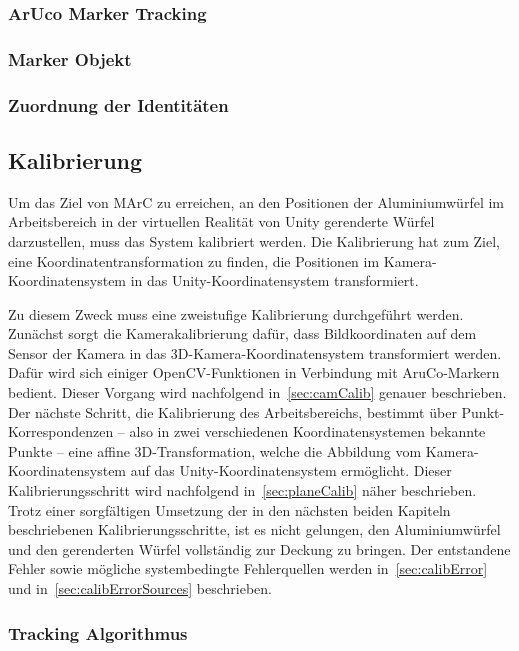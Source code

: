 \subsubsection{ArUco Marker Tracking}
\subsubsection{Marker Objekt}
\subsubsection{Zuordnung der Identitäten}



\subsection{Kalibrierung}\label{sec:calib}
Um das Ziel von MArC zu erreichen, an den Positionen der Aluminiumwürfel im Arbeitsbereich in der virtuellen Realität von Unity gerenderte Würfel darzustellen, muss das System kalibriert werden. Die Kalibrierung hat zum Ziel, eine Koordinatentransformation zu finden, die Positionen im Kamera-Koordinatensystem in das Unity-Koordinatensystem transformiert.

Zu diesem Zweck muss eine zweistufige Kalibrierung durchgeführt werden. Zunächst sorgt die Kamerakalibrierung dafür, dass Bildkoordinaten auf dem Sensor der Kamera in das 3D-Kamera-Koordinatensystem transformiert werden. Dafür wird sich einiger OpenCV-Funktionen in Verbindung mit AruCo-Markern bedient. Dieser Vorgang wird nachfolgend in~\ref{sec:camCalib} genauer beschrieben.\\
Der nächste Schritt, die Kalibrierung des Arbeitsbereichs, bestimmt über Punkt-Korrespondenzen -- also in zwei verschiedenen Koordinatensystemen bekannte Punkte -- eine affine 3D-Transformation, welche die Abbildung vom Kamera-Koordinaten\-system auf das Unity-Koordinatensystem ermöglicht. Dieser Kalibrierungsschritt wird nachfolgend in~\ref{sec:planeCalib} näher beschrieben.\\
Trotz einer sorgfältigen Umsetzung der in den nächsten beiden Kapiteln beschriebenen Kalibrierungsschritte, ist es nicht gelungen, den Aluminiumwürfel und den gerenderten Würfel vollständig zur Deckung zu bringen. Der entstandene Fehler sowie mögliche systembedingte Fehlerquellen werden in~\ref{sec:calibError} und in~\ref{sec:calibErrorSources} beschrieben. 
\subsubsection{Tracking Algorithmus} \label{sec:Tracking}

